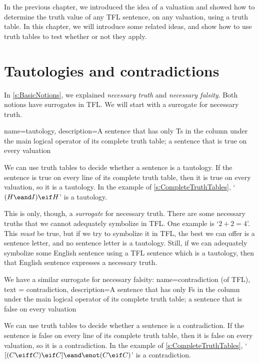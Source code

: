 In the previous chapter, we introduced the idea of a valuation and showed how to determine the truth value of any TFL sentence, on any valuation, using a truth table. In this chapter, we will introduce some related ideas, and show how to use truth tables to test whether or not they apply.


\section{Tautologies and contradictions}
In \cref{s:BasicNotions}, we explained \emph{necessary truth} and \emph{necessary falsity}. Both notions have surrogates in TFL. We will start with a surrogate for necessary truth.

{
name=tautology,
description={A sentence that has only Ts in the column under the main logical operator of its \gls{complete truth table}; a sentence that is true on every \gls{valuation}}
}

We can use truth tables to decide whether a sentence is a tautology. If the sentence is true on every line of its complete truth table, then it is true on every valuation, so it is a tautology. In the example of \cref{s:CompleteTruthTables}, `$(H \eand I) \eif H$' is a tautology.

This is only, though, a \emph{surrogate} for necessary truth. There are some necessary truths that we cannot adequately symbolize in TFL. One example is `$2 + 2 = 4$'. This \emph{must} be true, but if we try to symbolize it in TFL, the best we can offer is a sentence letter, and no sentence letter is a tautology. Still, if we can adequately symbolize some English sentence using a TFL sentence which is a tautology, then that English sentence expresses a necessary truth.

We have a similar surrogate for necessary falsity:
{
  name=contradiction (of TFL),
  text = contradiction,
description={A sentence that has only Fs in the column under the main logical operator of its \gls{complete truth table}; a sentence that is false on every \gls{valuation}}
}

We can use truth tables to decide whether a sentence is a contradiction. If the sentence is false on every line of its complete truth table, then it is false on every valuation, so it is a contradiction. In the example of \cref{s:CompleteTruthTables}, `$[(C\eiff C) \eif C] \eand \enot(C \eif C)$' is a contradiction.

